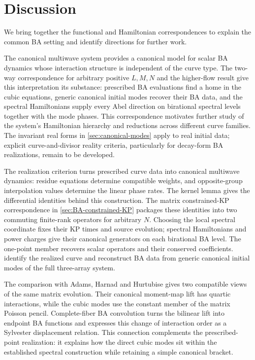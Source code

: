 \section{Discussion}\label{sec:discussion}

We bring together the functional and Hamiltonian correspondences to
explain the common BA setting and identify directions for further work.

The canonical multiwave system provides a canonical
model for scalar BA dynamics whose interaction structure is independent
of the curve type. The two-way correspondence for arbitrary positive $L,M,N$ and the
higher-flow result give this interpretation its substance: prescribed
BA evaluations find a home in the cubic equations, generic canonical
initial modes recover their BA data, and the spectral Hamiltonians
supply every Abel direction on birational spectral levels together
with the mode phases.
This correspondence motivates further study of the system's
Hamiltonian hierarchy and reductions across different curve families.
The invariant real forms in \cref{sec:canonical-modes} apply to real
initial data; explicit curve-and-divisor reality criteria, particularly
for decay-form BA realizations, remain to be developed.

The realization criterion turns prescribed curve data into canonical
multiwave dynamics: residue equations determine compatible weights,
and opposite-group interpolation values determine the linear phase
rates. The kernel lemma gives the differential identities behind this
construction. The matrix constrained-KP correspondence in
\cref{sec:BA-constrained-KP} packages these identities into two
commuting finite-rank operators for arbitrary $N$. Choosing the local
spectral coordinate fixes their KP times and source evolution;
spectral Hamiltonians and power charges give their canonical
generators on each birational BA level. The one-point member recovers
scalar operators and their conserved coefficients.
identify the realized curve and reconstruct BA data from generic
canonical initial modes of the full three-array system.

The comparison with Adams, Harnad and Hurtubise gives two compatible
views of the same matrix evolution. Their canonical moment-map lift
has quartic interactions, while the cubic modes use the constant
member of the matrix Poisson pencil. Complete-fiber BA convolution
turns the bilinear lift into endpoint BA functions and expresses this
change of interaction order as a Sylvester displacement relation.
This connection complements the prescribed-point realization: it
explains how the direct cubic modes sit within the established
spectral construction while retaining a simple canonical bracket.

